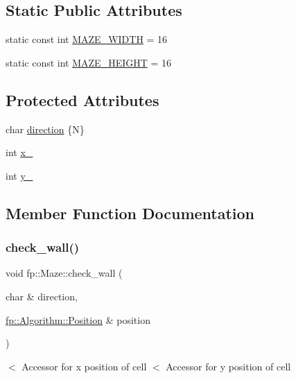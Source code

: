 \subsection*{Static Public Attributes}
\begin{DoxyCompactItemize}
\item 
static const int \hyperlink{classfp_1_1_maze_ae976c87b67bf82c41ede75a19ac28c2c}{M\+A\+Z\+E\+\_\+\+W\+I\+D\+TH} = 16
\item 
static const int \hyperlink{classfp_1_1_maze_a3cee2050b4d60bceacc9307e7016b931}{M\+A\+Z\+E\+\_\+\+H\+E\+I\+G\+HT} = 16
\end{DoxyCompactItemize}
\subsection*{Protected Attributes}
\begin{DoxyCompactItemize}
\item 
char \hyperlink{classfp_1_1_maze_a00c8f6ef7716d82c28e91b8cf29cbb68}{direction} \{\textquotesingle{}N\textquotesingle{}\}
\item 
int \hyperlink{classfp_1_1_maze_ab10af695c3474bccb24aef6737e10558}{x\+\_\+}
\item 
int \hyperlink{classfp_1_1_maze_a152c4b1c3cf98880b09cd4924c93245b}{y\+\_\+}
\end{DoxyCompactItemize}


\subsection{Member Function Documentation}
\mbox{\label{classfp_1_1_maze_aba1478e35759947964959de45b6e5cb9}} 
\subsubsection{\texorpdfstring{check\+\_\+wall()}{check\_wall()}}
{\footnotesize\ttfamily void fp\+::\+Maze\+::check\+\_\+wall (\begin{DoxyParamCaption}\item[{char \&}]{direction,  }\item[{\hyperlink{structfp_1_1_algorithm_1_1_position}{fp\+::\+Algorithm\+::\+Position} \&}]{position }\end{DoxyParamCaption})}

$<$ Accessor for x position of cell $<$ Accessor for y position of cell \mbox{\label{classfp_1_1_maze_af6396082d85af17f9dd383523e43e1a3}} 
